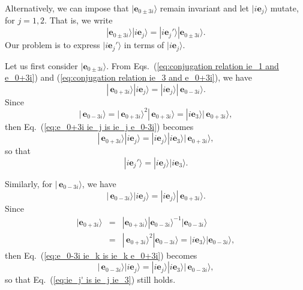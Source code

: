 \documentclass[11pt,twocolumn]{article}
\begin{document}
Alternatively, we can impose that $|\mathbf e_{0\pm 3i}\rangle$ remain invariant and let $|i\mathbf e_j\rangle$ mutate, for $j=1,2$.  That is, we write
\begin{equation}
\label{eq:e_0 pm 3i ie_j is ie_j' e_0 pm 3i}
|\mathbf e_{0\pm 3i}\rangle|i\mathbf e_j\rangle=|i\mathbf e_j'\rangle|\mathbf e_{0\pm 3i}\rangle.
\end{equation}
Our problem is to express $|i\mathbf e_j'\rangle$ in terms of $|i\mathbf e_j\rangle$.

Let us first consider $|\mathbf e_{0\pm 3i}\rangle$.  From Eqs.~(\ref{eq:conjugation relation ie_1 and e_0+3i}) and (\ref{eq:conjugation relation ie_3 and e_0+3i}), we have
\begin{equation}
\label{eq:e_0+3i ie_j is ie_j e_0-3i}
|\,\mathbf e_{0+3i}\rangle|i\mathbf e_j\rangle=|i\mathbf e_j\rangle|\,\mathbf e_{0-3i}\rangle.
\end{equation}
Since
\begin{equation}
\label{eq:e_0-3i is ie_3 e_0+3i}
|\,\mathbf e_{0-3i}\rangle=|\,\mathbf e_{0+3i}\rangle^2|\,\mathbf e_{0+3i}\rangle=|i\mathbf e_3\rangle|\,\mathbf e_{0+3i}\rangle,
\end{equation}
then Eq.~(\ref{eq:e_0+3i ie_j is ie_j e_0-3i}) becomes
\begin{equation}
\label{eq:e_0+3i ie_j is ie_j ie_3 e_0+3i}
|\,\mathbf e_{0+3i}\rangle|i\mathbf e_j\rangle=|i\mathbf e_j\rangle|i\mathbf e_3\rangle|\,\mathbf e_{0+3i}\rangle,
\end{equation}
so that
\begin{equation}
\label{eq:ie_j' is ie_j ie_3}
|i\mathbf e_j'\rangle=|i\mathbf e_j\rangle|i\mathbf e_3\rangle.
\end{equation}

Similarly, for $|\,\mathbf e_{0-3i}\rangle$, we have
\begin{equation}
\label{eq:e_0-3i ie_k is ie_k e_0+3i}
|\,\mathbf e_{0-3i}\rangle|i\mathbf e_j\rangle=|i\mathbf e_j\rangle|\,\mathbf e_{0+3i}\rangle.
\end{equation}
Since 
\begin{eqnarray}
\label{eq:e_0+3i is ie_3 e_0-3i}
|\mathbf e_{0+3i}\rangle&=&|\mathbf e_{0+3i}\rangle|\mathbf e_{0-3i}\rangle^{-1}|\mathbf e_{0-3i}\rangle\\
&=&|\,\mathbf e_{0+3i}\rangle^2|\mathbf e_{0-3i}\rangle=|i\mathbf e_3\rangle|\mathbf e_{0-3i}\rangle,
\end{eqnarray}
then Eq.~(\ref{eq:e_0-3i ie_k is ie_k e_0+3i}) becomes
\begin{equation}
\label{eq:e_0-3i ie_j is ie_j ie_3 e_0-3i}
|\,\mathbf e_{0-3i}\rangle|i\mathbf e_j\rangle=|i\mathbf e_j\rangle|i\mathbf e_3\rangle|\,\mathbf e_{0-3i}\rangle,
\end{equation}
so that Eq.~(\ref{eq:ie_j' is ie_j ie_3}) still holds.
\end{document}

